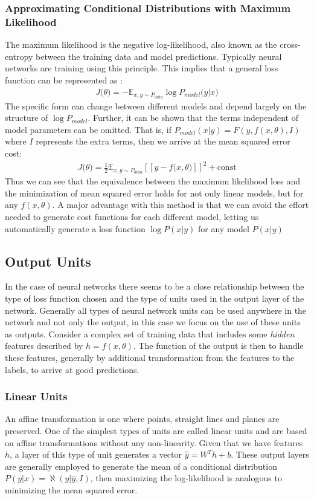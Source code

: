 \documentclass[12pt]{extarticle}
\numberwithin{equation}{section}
\begin{document}
	\subsubsection{Approximating Conditional Distributions with Maximum Likelihood}
	The maximum likelihood is the negative log-likelihood, also known as the cross-entropy between the training data and model predictions. Typically neural networks are training using this principle. This implies that a general loss function can be represented as :
	\begin{align}
	J\big(\theta\big) = -\mathbb{E}_{x,{y \sim P_{data}}}\log P_{model}\big(y|x\big)
	\end{align}
	The specific form can change between different models and depend largely on the structure of $\log P_{model}$. Further, it can be shown that the terms independent of model parameters can be omitted. That is, if $P_{model}(x | y) = F(y, f(x,\theta), I)$ where $I$ represents the extra terms, then we arrive at the mean squared error cost:
	\begin{align}
	J\big(\theta\big) = \frac{1}{2} \mathbb{E}_{x,{y \sim P_{data}}} [\![y - f\big(x, \theta\big)]\!]^2 + \text{const} \label{eq:mse_loss}
	\end{align}
	Thus we can see that the equivalence between the maximum likelihood loss and the minimization of mean squared error holds for not only linear models, but for any $f(x,\theta)$. A major advantage with this method is that we can avoid the effort needed to generate cost functions for each different model, letting us automatically generate a loss function $\log P(x | y)$ for any model $P(x | y)$
	\subsection{Output Units}
	In the case of neural networks there seems to be a close relationship between the type of loss function chosen and the type of units used in the output layer of the network. Generally all types of neural network units can be used anywhere in the network and not only the output, in this case we focus on the use of these units as outputs. Consider a complex set of training data that includes some \textit{hidden} features described by $h = f(x,\theta)$. The function of the output is then to handle these features, generally by additional transformation from the features to the labels, to arrive at good predictions.
	\subsubsection{Linear Units}\label{linear_unit}
	An affine transformation is one where points, straight lines and planes are preserved. One of the simplest types of units are called linear units and are based on affine transformations without any non-linearity. Given that we have features $h$, a layer of this type of unit generates a vector $\hat{y} = W^T h + b$. These output layers are generally employed to generate the mean of a conditional distribution $P(y | x) = \aleph(y | \hat{y}, I)$, then maximizing the log-likelihood is analogous to minimizing the mean squared error.
\end{document}

